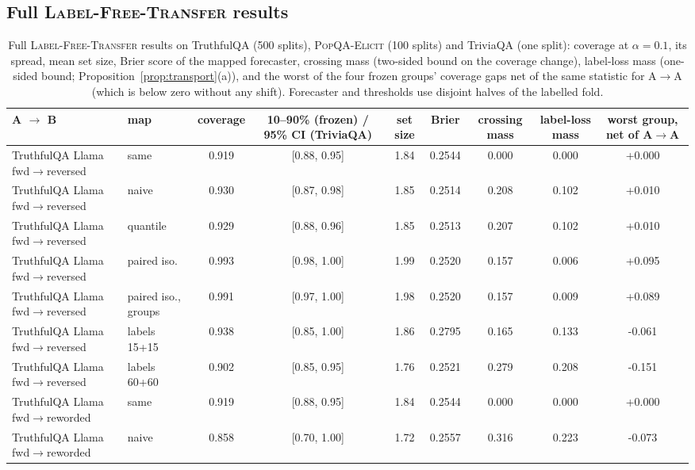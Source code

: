 \documentclass[twoside]{article}
\theoremstyle{definition}
\theoremstyle{remark}
\newcommand{\1}{\mathbf{1}}
\newcommand{\expname}[1]{\textsc{#1}}
\begin{document}
\subsection{Full \expname{Label-Free-Transfer} results}
\label{app:e8}
\begin{table}[t]
\caption{Full \expname{Label-Free-Transfer} results on TruthfulQA (500 splits), \expname{PopQA-Elicit} (100 splits) and TriviaQA (one split): coverage at $\alpha=0.1$, its spread, mean set size, Brier score of the mapped forecaster, crossing mass (two-sided bound on the coverage change), label-loss mass (one-sided bound; Proposition~\ref{prop:transport}(a)), and the worst of the four frozen groups' coverage gaps net of the same statistic for A$\to$A (which is below zero without any shift). Forecaster and thresholds use disjoint halves of the labelled fold.}
\centering\small
\begin{adjustbox}{max width=\textwidth}
\begin{tabular}{llccccccc}
\toprule
A $\to$ B & map & coverage & 10--90\% (frozen) / 95\% CI (TriviaQA) & set size & Brier & crossing mass & label-loss mass & worst group, net of A$\to$A\\
\midrule
TruthfulQA Llama fwd$\to$reversed & same & 0.919 & [0.88, 0.95] & 1.84 & 0.2544 & 0.000 & 0.000 & +0.000\\
TruthfulQA Llama fwd$\to$reversed & naive & 0.930 & [0.87, 0.98] & 1.85 & 0.2514 & 0.208 & 0.102 & +0.010\\
TruthfulQA Llama fwd$\to$reversed & quantile & 0.929 & [0.88, 0.96] & 1.85 & 0.2513 & 0.207 & 0.102 & +0.010\\
TruthfulQA Llama fwd$\to$reversed & paired iso. & 0.993 & [0.98, 1.00] & 1.99 & 0.2520 & 0.157 & 0.006 & +0.095\\
TruthfulQA Llama fwd$\to$reversed & paired iso., groups & 0.991 & [0.97, 1.00] & 1.98 & 0.2520 & 0.157 & 0.009 & +0.089\\
TruthfulQA Llama fwd$\to$reversed & labels 15+15 & 0.938 & [0.85, 1.00] & 1.86 & 0.2795 & 0.165 & 0.133 & -0.061\\
TruthfulQA Llama fwd$\to$reversed & labels 60+60 & 0.902 & [0.85, 0.95] & 1.76 & 0.2521 & 0.279 & 0.208 & -0.151\\
\midrule
TruthfulQA Llama fwd$\to$reworded & same & 0.919 & [0.88, 0.95] & 1.84 & 0.2544 & 0.000 & 0.000 & +0.000\\
TruthfulQA Llama fwd$\to$reworded & naive & 0.858 & [0.70, 1.00] & 1.72 & 0.2557 & 0.316 & 0.223 & -0.073\\

\end{tabular}
\end{adjustbox}
\end{table}
\end{document}
